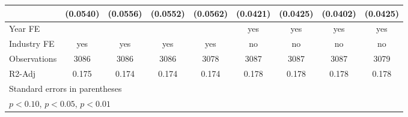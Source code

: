 \begin{table}[htbp]
\begin{tabular}{l*{8}{c}}
                    &    (0.0540)         &    (0.0556)         &    (0.0552)         &    (0.0562)         &    (0.0421)         &    (0.0425)         &    (0.0402)         &    (0.0425)         \\
\hline
Year FE             &                     &                     &                     &                     &         yes         &         yes         &         yes         &         yes         \\
Industry FE         &         yes         &         yes         &         yes         &         yes         &          no         &          no         &          no         &          no         \\
Observations        &        3086         &        3086         &        3086         &        3078         &        3087         &        3087         &        3087         &        3079         \\
R2-Adj              &       0.175         &       0.174         &       0.174         &       0.174         &       0.178         &       0.178         &       0.178         &       0.178         \\
\hline\hline
\multicolumn{9}{l}{\footnotesize Standard errors in parentheses}\\
\multicolumn{9}{l}{\footnotesize \sym{*} \(p<0.10\), \sym{**} \(p<0.05\), \sym{***} \(p<0.01\)}\\
\end{tabular}
\end{table}
